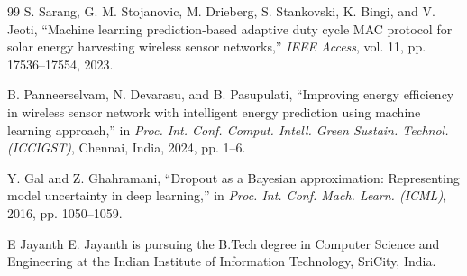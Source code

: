 \documentclass[journal]{IEEEtran}
\begin{document}
\begin{thebibliography}{99}
S. Sarang, G. M. Stojanovic, M. Drieberg, S. Stankovski, K. Bingi, and V. Jeoti, ``Machine learning prediction-based adaptive duty cycle MAC protocol for solar energy harvesting wireless sensor networks,'' \textit{IEEE Access}, vol. 11, pp. 17536--17554, 2023.

B. Panneerselvam, N. Devarasu, and B. Pasupulati, ``Improving energy efficiency in wireless sensor network with intelligent energy prediction using machine learning approach,'' in \textit{Proc. Int. Conf. Comput. Intell. Green Sustain. Technol. (ICCIGST)}, Chennai, India, 2024, pp. 1--6.

Y. Gal and Z. Ghahramani, ``Dropout as a Bayesian approximation: Representing model uncertainty in deep learning,'' in \textit{Proc. Int. Conf. Mach. Learn. (ICML)}, 2016, pp. 1050--1059.

\end{thebibliography}

\begin{IEEEbiography}{E Jayanth}
E. Jayanth is pursuing the B.Tech degree in Computer Science and Engineering at the Indian Institute of Information Technology, SriCity, India.
\end{IEEEbiography}
\end{document}

